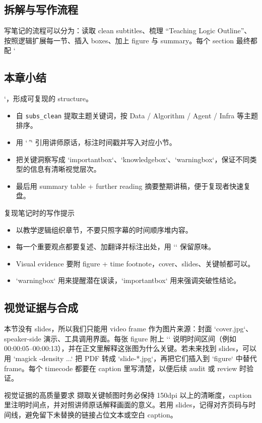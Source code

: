 \documentclass[a4paper]{article}
\begin{document}
\subsection{拆解与写作流程}
写笔记的流程可以分为：读取 clean subtitles、梳理 ``Teaching Logic Outline''、按照逻辑扩展每一节、插入 boxes、加上 figure 与 summary。每个 section 最终都配 `\subsection{本章小结}`，形成可复现的 structure。
\begin{itemize}
    \item 自 \texttt{subs\_clean} 提取主题关键词，按 Data / Algorithm / Agent / Infra 等主题排序。
    \item 用 `\textit{''}` 引用讲师原话，标注时间戳并写入对应小节。
    \item 把关键洞察写成 `importantbox`、`knowledgebox`、`warningbox`，保证不同类型的信息有清晰视觉层次。
    \item 最后用 summary table + further reading 摘要整期讲稿，便于复现者快速复盘。
\end{itemize}
\begin{knowledgebox}{复现笔记时的写作提示}
\begin{itemize}
    \item 以教学逻辑组织章节，不要只照字幕的时间顺序堆内容。
    \item 每一个重要观点都要复述、加翻译并标注出处，用 `\textit{}` 保留原味。
    \item Visual evidence 要附 figure + time footnote，cover、slides、关键帧都可以。
    \item `warningbox` 用来提醒潜在误读，`importantbox` 用来强调突破性结论。
\end{itemize}
\end{knowledgebox}

\subsection{视觉证据与合成}
本节没有 slides，所以我们只能用 video frame 作为图片来源：封面 `cover.jpg`、speaker-side 演示、工具调用界面。每张 figure 附上 `\protect\footnotemark` 说明时间区间（例如 00:00:05--00:00:13），并在正文里解释这张图为什么关键。若未来找到 slides，可以用 `magick -density ...` 把 PDF 转成 `slide-*.jpg`，再把它们插入到 `figure` 中替代 frame。每个 timecode 都要在 caption 里写清楚，以便后续 audit 或 review 时验证。

\begin{importantbox}{视觉证据的高质量要求}
撷取关键帧图时务必保持 150dpi 以上的清晰度，caption 里注明时间点，并对照讲师原话解释画面的意义。若用 slides，记得对齐页码与时间线，避免留下未替换的链接占位文本或空白 caption。
\end{importantbox}
\end{document}
